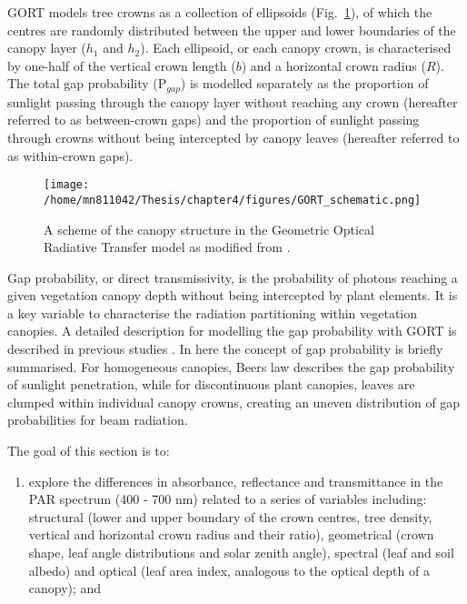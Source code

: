 \documentclass[a4paper,11pt]{report}
\begin{document}
GORT models tree crowns as a collection of ellipsoids (Fig.~\ref{fig:gort_scheme}), of which the centres are randomly distributed between the upper and lower boundaries of the canopy layer ($h_1$ and $h_2$). Each ellipsoid, or each canopy crown, is characterised by one-half of the vertical crown length ($b$) and a horizontal crown radius ($R$). The total gap probability (P$_{gap}$) is modelled separately as the proportion of sunlight passing through the canopy layer without reaching any crown (hereafter referred to as between-crown gaps) and the proportion of sunlight passing through crowns without being intercepted by canopy leaves (hereafter referred to as within-crown gaps). 

\begin{figure}[ht]
      	\centering
        \texttt{[image: /home/mn811042/Thesis/chapter4/figures/GORT\_schematic.png]}
        \caption{A scheme of the canopy structure in the Geometric Optical Radiative Transfer model as modified from \citet{Ni1998}.} 
\label{fig:gort_scheme}
\end{figure}

Gap probability, or direct transmissivity, is the probability of photons reaching a given vegetation canopy depth without being intercepted by plant elements. It is a key variable to characterise the radiation partitioning within vegetation canopies. A detailed description for modelling the gap probability with GORT is described in previous studies \citep{Li1995,Ni1999}. In here the concept of gap probability is briefly summarised. For  homogeneous  canopies,  Beer\textsc{}s  law  describes  the gap  probability  of  sunlight  penetration, while for discontinuous plant canopies, leaves are clumped within individual canopy crowns, creating an uneven distribution of gap probabilities for beam radiation.

The goal of this section is to: 
\begin{enumerate}
\item explore the differences in absorbance, reflectance and transmittance in the PAR spectrum (400 - 700 nm) related to a series of variables including: structural (lower and upper boundary of the crown centres, tree density, vertical and horizontal crown radius and their ratio), geometrical (crown shape, leaf angle distributions and solar zenith angle), spectral (leaf and soil albedo) and optical (leaf area index, analogous to the optical depth of a canopy); and 
\end{enumerate}
\end{document}
